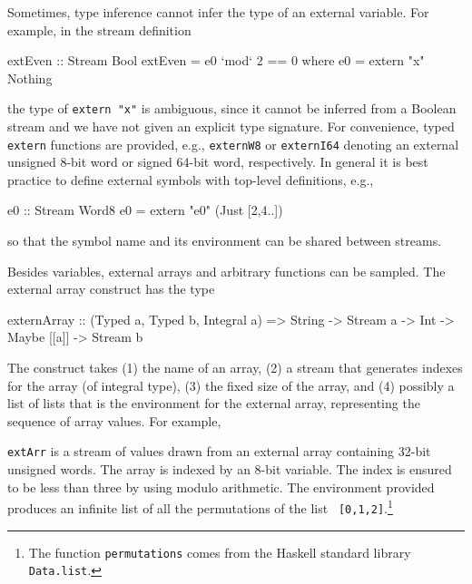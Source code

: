 Sometimes, type inference cannot infer the type of an external variable.  For
example, in the stream definition
%
\begin{code}
extEven :: Stream Bool
extEven = e0 `mod` 2 == 0
  where e0 = extern "x" Nothing 
\end{code}
%
\noindent
the type of {\tt extern "x"} is ambiguous, since it cannot be inferred from a
Boolean stream and we have not given an explicit type signature.  For
convenience, typed {\tt extern} functions are provided, e.g., {\tt externW8} or
{\tt externI64} denoting an external unsigned 8-bit word or signed 64-bit word,
respectively.  In general it is best practice to define external symbols with
top-level definitions, e.g.,
%
\begin{code}
e0 :: Stream Word8
e0 = extern "e0" (Just [2,4..])
\end{code}

\noindent
so that the symbol name and its environment can be shared between streams.

Besides variables, external arrays and arbitrary functions can be sampled.  The
external array construct has the type
%
\begin{code}
externArray :: (Typed a, Typed b, Integral a) 
            => String -> Stream a -> Int 
            -> Maybe [[a]] -> Stream b  
\end{code}
%
The construct takes (1) the name of an array, (2) a stream that generates indexes for
the array (of integral type), (3) the fixed size of the array, and (4) possibly a list of lists that is the
environment for the external array, representing the sequence of array values.  For example,
%
{\tt extArr} is a stream of values drawn from an external array containing
32-bit unsigned words.  The array is indexed by an 8-bit variable.  The index
is ensured to be less than three by using modulo arithmetic.  The environment
provided produces an infinite list of all the permutations of the list {\tt
  [0,1,2]}.\footnote{The function {\tt permutations} comes from the Haskell
    standard library {\tt Data.list}.}



